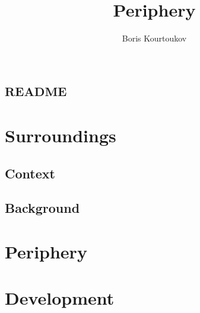 \documentclass[nofonts,sfsidenotes]{tufte-book}
\title{Periphery}
\author[Boris Kourtoukov]{Boris Kourtoukov}
\begin{document}

	\frontmatter
		
	\chapter*{\textsc{readme}}\label{ch.readme}
		



	\mainmatter


	\chapter{Surroundings}\label{ch:introduction}
		

		\section{Context}\label{sec:context}
			

		\section{Background}\label{sec:background}
			




	\chapter{Periphery}\label{ch:periphery}
		




	\chapter{Development}\label{ch:development}
		
\end{document}
